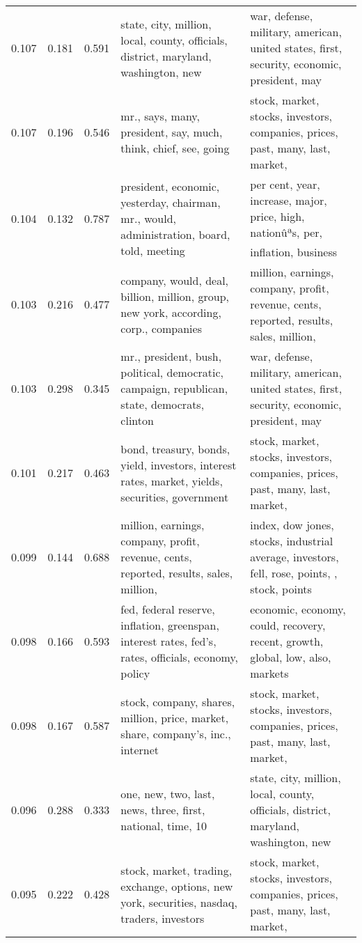 \begin{tabular}{cccp{5cm}p{5cm}}
0.107 & 0.181 & 0.591 & state, city, million, local, county, officials, district, maryland, washington, new & war, defense, military, american, united states, first, security, economic, president, may \\
0.107 & 0.196 & 0.546 & mr., says, many, president, say, much, think, chief, see, going & stock, market, stocks, investors, companies, prices, past, many, last, market,  \\
0.104 & 0.132 & 0.787 & president, economic, yesterday, chairman, mr., would, administration, board, told, meeting & per cent, year, increase, major, price, high, nationûªs, per, inflation, business \\
0.103 & 0.216 & 0.477 & company, would, deal, billion, million, group, new york, according, corp., companies & million, earnings, company, profit, revenue, cents, reported, results, sales, million,  \\
0.103 & 0.298 & 0.345 & mr., president, bush, political, democratic, campaign, republican, state, democrats, clinton & war, defense, military, american, united states, first, security, economic, president, may \\
0.101 & 0.217 & 0.463 & bond, treasury, bonds, yield, investors, interest rates, market, yields, securities, government & stock, market, stocks, investors, companies, prices, past, many, last, market,  \\
0.099 & 0.144 & 0.688 & million, earnings, company, profit, revenue, cents, reported, results, sales, million,  & index, dow jones, stocks, industrial average, investors, fell, rose, points, , stock, points \\
0.098 & 0.166 & 0.593 & fed, federal reserve, inflation, greenspan, interest rates, fed's, rates, officials, economy, policy & economic, economy, could, recovery, recent, growth, global, low, also, markets \\
0.098 & 0.167 & 0.587 & stock, company, shares, million, price, market, share, company's, inc., internet & stock, market, stocks, investors, companies, prices, past, many, last, market,  \\
0.096 & 0.288 & 0.333 & one, new, two, last, news, three, first, national, time, 10 & state, city, million, local, county, officials, district, maryland, washington, new \\
0.095 & 0.222 & 0.428 & stock, market, trading, exchange, options, new york, securities, nasdaq, traders, investors & stock, market, stocks, investors, companies, prices, past, many, last, market,  \\

\end{tabular}
